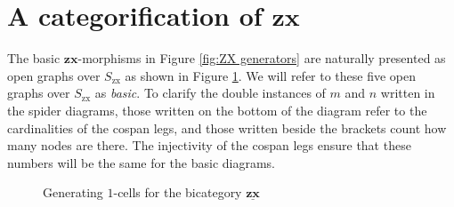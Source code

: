 \documentclass[]{amsart}
\theoremstyle{defn}
\begin{document}
\section{A categorification of $\mathbf{zx}$}
\label{sec:zx categorified}

The basic $\mathbf{zx}$-morphisms in Figure \ref{fig:ZX generators} are naturally presented as open graphs over $S_{\text{zx}}$ as shown in Figure \ref{fig:ZX 1cells generators}.  We will refer to these five open graphs over $S_{\text{zx}}$ as \emph{basic}.  To clarify the double instances of $m$ and $n$ written in the spider diagrams, those written on the bottom of the diagram refer to the cardinalities of the cospan legs, and those written beside the brackets count how many nodes are there.  The injectivity of the cospan legs ensure that these numbers will be the same for the basic diagrams.

\begin{figure}[h]
	\caption{Generating $1$-cells for the bicategory $\underline{\mathbf{zx}}$}
	\label{fig:ZX 1cells generators}
\end{figure} 
\end{document}
